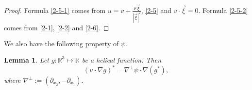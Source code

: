 \documentclass[12pt,reqno]{amsart}
\numberwithin{equation}{section}
\newtheorem{lemma}[theorem]{Lemma}
\theoremstyle{definition}
\theoremstyle{remark}
\newcommand{\Om}{\Omega}
\begin{document}
\begin{proof}
Formula \eqref{2-5-1} comes from $ u=v+\frac{F\vec{\xi}}{|\vec{\xi}|^2} $, \eqref{2-5} and $ v\cdot \vec{\xi}=0 $. Formula \eqref{2-5-2} comes from \eqref{2-1}, \eqref{2-2} and \eqref{2-6}.
\end{proof}
We also have the following property of $ \psi $.%
\begin{lemma} \label{lm2-5}
Let $g: \mathbb R^3\mapsto \mathbb R$ be a helical function. Then
	\begin{equation*}
		\left (u \cdot \nabla g\right )^* = \nabla^\perp\psi \cdot\nabla (g^*),
	\end{equation*}
where $ \nabla^\perp:=(\partial_{x_2},-\partial_{x_1}). $
\end{lemma}
\end{document}

